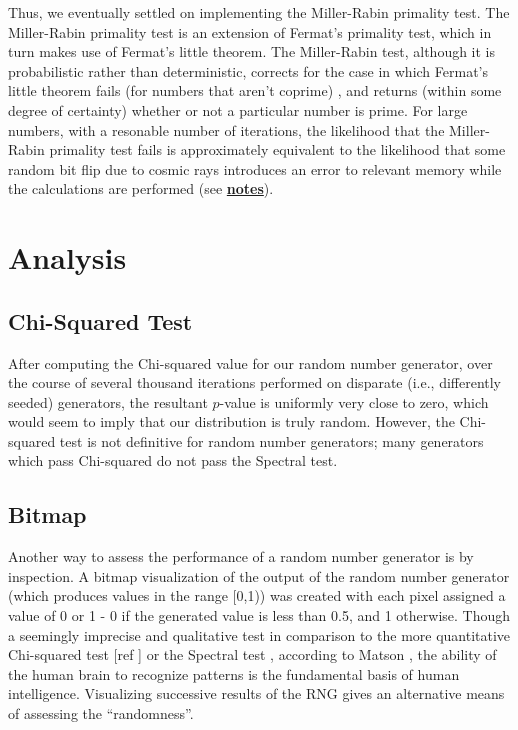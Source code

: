 \documentclass{article}
\begin{document}
Thus, we eventually settled on implementing the Miller-Rabin primality test. The Miller-Rabin primality test is an extension of Fermat's primality test, which in turn makes use of Fermat's little theorem. The Miller-Rabin test, although it is probabilistic rather than deterministic, corrects for the case in which Fermat's little theorem fails (for numbers that aren't coprime) \cite{millerrabin}, and returns (within some degree of certainty) whether or not a particular number is prime. For large numbers, with a resonable number of iterations, the likelihood that the Miller-Rabin primality test fails is approximately equivalent to the likelihood that some random bit flip due to cosmic rays introduces an error to relevant memory while the calculations are performed (see \textbf{\hyperref[sec:rays]{notes}}).


\section{Analysis}
\subsection{Chi-Squared Test}
\label{chi}
After computing the Chi-squared value for our random number generator, over the course of several thousand iterations performed on disparate (i.e., differently seeded) generators, the resultant $p$-value is uniformly very close to zero, which would seem to imply that our distribution is truly random. However, the Chi-squared test is not definitive for random number generators; many generators which pass Chi-squared do not pass the Spectral test.

\subsection{Bitmap}
Another way to assess the performance of a random number generator is by inspection. A bitmap visualization of the output of the random number generator (which produces values in the range [0,1)) was created with each pixel assigned a value of 0 or 1 - 0 if the generated value is less than 0.5, and 1 otherwise. Though a seemingly imprecise and qualitative test in comparison to the more quantitative Chi-squared test [ref ] or the Spectral test \cite{spectral}, according to Matson \cite{matson}, the ability of the human brain to recognize patterns is the fundamental basis of human intelligence. Visualizing successive results of the RNG gives an alternative means of assessing the ``randomness''.
\end{document}
